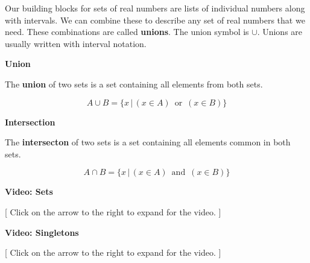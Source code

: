 \documentclass{ximera}
\begin{document}
Our building blocks for sets of real numbers are lists of individual numbers along with intervals.  We can combine these to describe any set of real numbers that we need.  These combinations are called \textbf{unions}.  The union symbol is $\cup$. Unions are usually written with interval notation.



\begin{definition} \textbf{\textcolor{green!50!black}{Union}}

The \textbf{union} of two sets is a set containing all elements from both sets.


\[
A \cup B = \{  x \, | \, (x \in A) \, \text{ or } \, (x \in B)  \}
\]


\end{definition}





\begin{definition} \textbf{\textcolor{green!50!black}{Intersection}}

The \textbf{intersecton} of two sets is a set containing all elements common in both sets.


\[
A \cap B = \{  x \, | \, (x \in A) \, \text{ and } \, (x \in B)  \}
\]


\end{definition}





\begin{onlineOnly}
\begin{explanation} \textbf{\textcolor{red!75!green}{Video: Sets}}

[ Click on the arrow to the right to expand for the video. ]
\begin{expandable} 

\begin{center}
\end{center}

\end{expandable}

\end{explanation}
\end{onlineOnly}








\begin{onlineOnly}
\begin{explanation} \textbf{\textcolor{red!75!green}{Video: Singletons}} 

[ Click on the arrow to the right to expand for the video. ]
\begin{expandable} 

\begin{center}
\end{center}

\end{expandable}

\end{explanation}
\end{onlineOnly}
\end{document}

